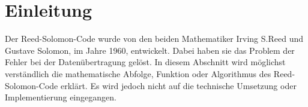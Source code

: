 %
%
%
\section{Einleitung
\label{reedsolomon:section:einleitung}}
Der Reed-Solomon-Code wurde von den beiden Mathematiker Irving S.Reed und Gustave Solomon, im Jahre 1960, entwickelt.
Dabei haben sie das Problem der Fehler bei der Datenübertragung gelöst.
In diesem Abschnitt wird möglichst verständlich die mathematische Abfolge, 
Funktion oder Algorithmus des Reed-Solomon-Code erklärt.
Es wird jedoch nicht auf die technische Umsetzung oder Implementierung eingegangen.




